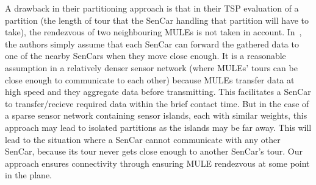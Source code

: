 
A drawback in their partitioning approach is that in their TSP evaluation of a partition (the length of tour that the SenCar handling that partition will have to take), the rendezvous of two neighbouring MULEs is not taken in account. In~\cite{sim4}, the authors simply assume that each SenCar can forward the gathered data to one of the nearby SenCars when they move close enough. It is a reasonable assumption in a relatively denser sensor network (where MULEs' tours can be close enough to communicate to each other) because MULEs transfer data at high speed and they aggregate data before transmitting. This facilitates a SenCar to transfer/recieve required data within the brief contact time. But in the case of a sparse sensor network containing sensor islands, each with similar weights, this approach may lead to isolated partitions as the islands may be far away. This will lead to the situation where a SenCar cannot communicate with any other SenCar, because its tour never gets close enough to another SenCar's tour. Our approach ensures connectivity through ensuring MULE rendezvous at some point in the plane.

